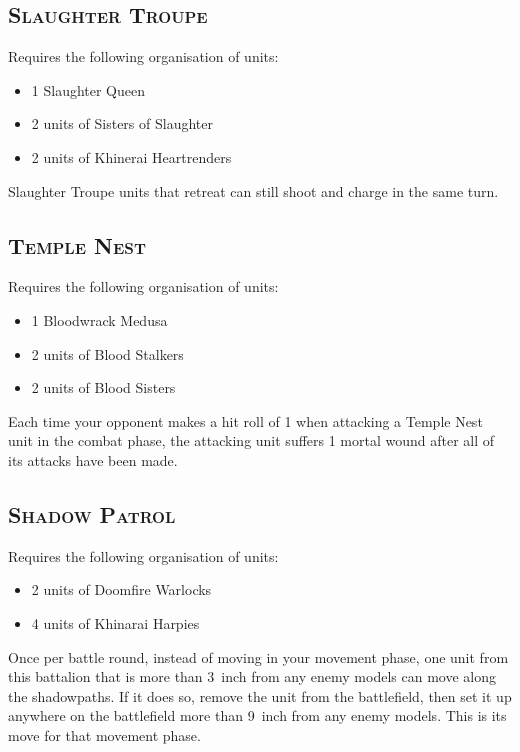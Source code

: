 \subsection{\textsc{Slaughter Troupe}}
Requires the following organisation of units:
\begin{itemize}
    \tightlist
    \item 1 Slaughter Queen
    \item 2 units of Sisters of Slaughter
    \item 2 units of Khinerai Heartrenders
\end{itemize}
\begin{description}
    \tightlist
    \item [\htarget{gladiatorial-acrobatics}{Gladiatorial Acrobatics}]
        Slaughter Troupe units that retreat can still shoot and charge in the
        same turn. 
\end{description}

\subsection{\textsc{Temple Nest}}
Requires the following organisation of units:
\begin{itemize}
    \tightlist
    \item 1 Bloodwrack Medusa
    \item 2 units of Blood Stalkers
    \item 2 units of Blood Sisters
\end{itemize}
\begin{description}
    \tightlist
    \item [\htarget{lethal-transfixion}{Lethal Transfixion}] Each time your
        opponent makes a hit roll of 1 when attacking a Temple Nest unit in the
        combat phase, the attacking unit suffers 1 mortal wound after all of
        its attacks have been made. 
\end{description}

\subsection{\textsc{Shadow Patrol}}
Requires the following organisation of units:
\begin{itemize}
    \tightlist
    \item 2 units of Doomfire Warlocks
    \item 4 units of Khinarai Harpies
\end{itemize}
\begin{description}
    \tightlist
    \item [\htarget{shadowpaths}{Shadowpaths}] Once per battle round, instead
        of moving in your movement phase, one unit from this battalion that is
        more than 3~inch from any enemy models can move along the shadowpaths.
        If it does so, remove the unit from the battlefield, then set it up
        anywhere on the battlefield more than 9~inch from any enemy models.
        This is its move for that movement phase.
\end{description}

